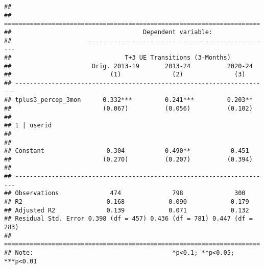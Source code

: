 \begin{verbatim}
## 
## ======================================================================
##                                    Dependent variable:                
##                     --------------------------------------------------
##                               T+3 UE Transitions (3-Months)           
##                      Orig. 2013-19       2013-24          2020-24     
##                           (1)              (2)              (3)       
## ----------------------------------------------------------------------
## tplus3_percep_3mon      0.332***         0.241***         0.203**     
##                         (0.067)          (0.056)          (0.102)     
##                                                                       
## 1 | userid                                                            
##                                                                       
##                                                                       
## Constant                 0.304           0.490**           0.451      
##                         (0.270)          (0.207)          (0.394)     
##                                                                       
## ----------------------------------------------------------------------
## Observations              474              798              300       
## R2                       0.168            0.090            0.179      
## Adjusted R2              0.139            0.071            0.132      
## Residual Std. Error 0.398 (df = 457) 0.436 (df = 781) 0.447 (df = 283)
## ======================================================================
## Note:                                      *p<0.1; **p<0.05; ***p<0.01
\end{verbatim}

